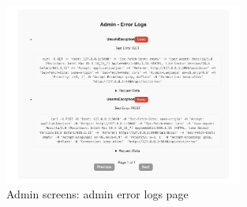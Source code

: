 \begin{figure}[!h]
    \centering
    \includegraphics[width=0.7\textwidth]{chapters/chapter_03/page/admin/admin-error-logs-page}
    \caption{Admin screens: admin error logs page}
    \label{fig:admin-error-logs-wireframes}
\end{figure}




